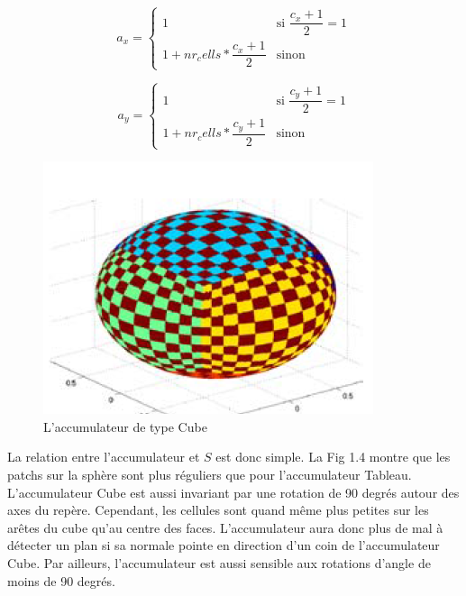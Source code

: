 ﻿\documentclass[12pt, twoside]{article}
\begin{document}
\begin{equation*}
  a_x = 
     \begin{cases}
        1 & \text{si $\dfrac{c_x + 1}{2} = 1$} \\
        1 + nr_cells*\dfrac{c_x + 1}{2} & \text{sinon}
     \end{cases}
\end{equation*}

\begin{equation*}
  a_y = 
     \begin{cases}
        1 & \text{si $\dfrac{c_y + 1}{2} = 1$} \\
        1 + nr_cells*\dfrac{c_y + 1}{2} & \text{sinon}
     \end{cases}
\end{equation*}

\begin{figure}[h]
\centering
\includegraphics[scale=0.65]{Cube.png}
\caption{\label{fig:Cube} L'accumulateur de type Cube}
\end{figure}

La relation entre l’accumulateur et $S$ est donc simple. La Fig 1.4 montre que les patchs sur la sphère sont plus réguliers que pour l’accumulateur Tableau. L’accumulateur Cube est aussi invariant par une rotation de 90 degrés autour des axes du repère. Cependant, les cellules sont quand même plus petites sur les arêtes du cube qu’au centre des faces. L’accumulateur aura donc plus de mal à détecter un plan si sa normale pointe en direction d’un coin de l’accumulateur Cube. Par ailleurs, l’accumulateur est aussi sensible aux rotations d’angle de moins de 90 degrés.
\end{document}
